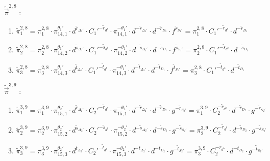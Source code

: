 \begin{enumerate}
\item[$\tilde{\vec{\pi}}^{2,8}$]:
  \begin{enumerate}
  \item $\tilde{\pi}^{2,8}_1 = \pi^{2,8}_1 \cdot \pi_{14,1}^{\theta_1'} \cdot d^{\tilde{r}_{\Delta_1'}} \cdot C_1'^{-\tilde{r}_{d^b}} \cdot \pi_{14,1}^{-\theta_1'} \cdot d^{-\tilde{r}_{\Delta_1'}} \cdot d^{-\tilde{r}_{D_1}} \cdot f^{\tilde{r}_{S_1'}} = \pi^{2,8}_1 \cdot C_1'^{-\tilde{r}_{d^b}} \cdot d^{-\tilde{r}_{D_1}}$
  \item $\tilde{\pi}^{2,8}_2 = \pi^{2,8}_2 \cdot \pi_{14,2}^{\theta_1'} \cdot d^{\tilde{s}_{\Delta_1'}} \cdot C_1'^{-\tilde{s}_{d^b}} \cdot \pi_{14,2}^{-\theta_1'} \cdot d^{-\tilde{s}_{\Delta_1'}} \cdot d^{-\tilde{s}_{D_1}} \cdot f^{\tilde{s}_{S_1'}} = \pi^{2,8}_2 \cdot C_1'^{-\tilde{s}_{d^b}} \cdot d^{-\tilde{s}_{D_1}}$
  \item $\tilde{\pi}^{2,8}_3 = \pi^{2,8}_3 \cdot \pi_{14,3}^{\theta_1'} \cdot d^{\tilde{t}_{\Delta_1'}} \cdot C_1'^{-\tilde{t}_{d^b}} \cdot \pi_{14,3}^{-\theta_1'} \cdot d^{-\tilde{t}_{\Delta_1'}} \cdot d^{-\tilde{t}_{D_1}} \cdot f^{\tilde{t}_{S_1'}} = \pi^{2,8}_3 \cdot C_1'^{-\tilde{t}_{d^b}} \cdot d^{-\tilde{t}_{D_1}}$
  \end{enumerate}
\item[$\tilde{\vec{\pi}}^{3,9}$]:
  \begin{enumerate}
  \item $\tilde{\pi}^{3,9}_1 = \pi^{3,9}_1 \cdot \pi_{15,1}^{\theta_2'} \cdot d^{\tilde{r}_{\Delta_2'}} \cdot C_2'^{-\tilde{r}_{d^b}} \cdot \pi_{15,1}^{-\theta_2'} \cdot d^{-\tilde{r}_{\Delta_2'}} \cdot d^{-\tilde{r}_{D_2}} \cdot g^{-\tilde{r}_{S_2'}} = \pi^{3,9}_1 \cdot C_2^{-\tilde{r}_{d^b}} \cdot d^{-\tilde{r}_{D_2}} \cdot g^{-\tilde{r}_{S_2'}}$
  \item $\tilde{\pi}^{3,9}_2 = \pi^{3,9}_2 \cdot \pi_{15,2}^{\theta_2'} \cdot d^{\tilde{s}_{\Delta_2'}} \cdot C_2'^{-\tilde{s}_{d^b}} \cdot \pi_{15,2}^{-\theta_2'} \cdot d^{-\tilde{s}_{\Delta_2'}} \cdot d^{-\tilde{s}_{D_2}} \cdot g^{-\tilde{s}_{S_2'}} = \pi^{3,9}_2 \cdot C_2^{-\tilde{r}_{d^b}} \cdot d^{-\tilde{s}_{D_2}} \cdot g^{-\tilde{s}_{S_2'}}$
  \item $\tilde{\pi}^{3,9}_3 = \pi^{3,9}_3 \cdot \pi_{15,3}^{\theta_2'} \cdot d^{\tilde{t}_{\Delta_2'}} \cdot C_2'^{-\tilde{t}_{d^b}} \cdot \pi_{15,3}^{-\theta_2'} \cdot d^{-\tilde{t}_{\Delta_2'}} \cdot d^{-\tilde{t}_{D_2}} \cdot g^{-\tilde{t}_{S_2'}} = \pi^{3,9}_3 \cdot C_2^{-\tilde{r}_{d^b}} \cdot d^{-\tilde{t}_{D_2}} \cdot g^{-\tilde{t}_{S_2'}}$

\end{enumerate}
\end{enumerate}
